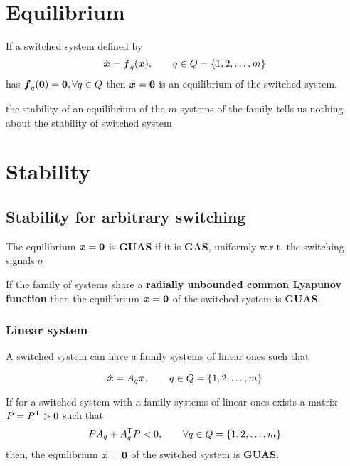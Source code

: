 \section{Equilibrium}

\begin{theorem}
	If a switched system defined by
	\[
		\dot{\boldsymbol{x}} = \boldsymbol{f}_q(\boldsymbol{x}), \qquad q \in Q = \{1,2,\dots,m\}
	\]
	has $\boldsymbol{f}_q(\boldsymbol{0}) = \boldsymbol{0}, \forall q \in Q$ then $\boldsymbol{x} = \boldsymbol{0}$ is an equilibrium of the switched system.
\end{theorem}

\begin{nb}the stability of an equilibrium of the $m$ systems of the family tells us nothing about the stability of switched system\end{nb}

\section{Stability}

\subsection{Stability for arbitrary switching}

\begin{definition}
	The equilibrium $\boldsymbol{x}=\boldsymbol{0}$ is \textbf{GUAS} if it is \textbf{GAS}, uniformly w.r.t. the switching signals $\sigma$
\end{definition}

\begin{theorem}
	If the family of systems share a \textbf{radially unbounded common Lyapunov function} then the equilibrium $\boldsymbol{x}=\boldsymbol{0}$ of the switched system is \textbf{GUAS}.
\end{theorem}

\subsubsection{Linear system}

A switched system can have a family systems of linear ones such that

\[
	\dot{\boldsymbol{x}} = A_q \boldsymbol{x}, \qquad q \in Q = \{1,2,\dots,m\}
\]

\begin{theorem}
	If for a switched system with a family systems of linear ones exists a matrix $P = P^{\mathsf{T}} > 0$ such that
	\[
		PA_q + A_q^{\mathsf{T}} P < 0, \qquad \forall q \in Q = \{1,2,\dots,m\}
	\]
	then, the equilibrium $\boldsymbol{x}=\boldsymbol{0}$ of the switched system is \textbf{GUAS}.
\end{theorem}

